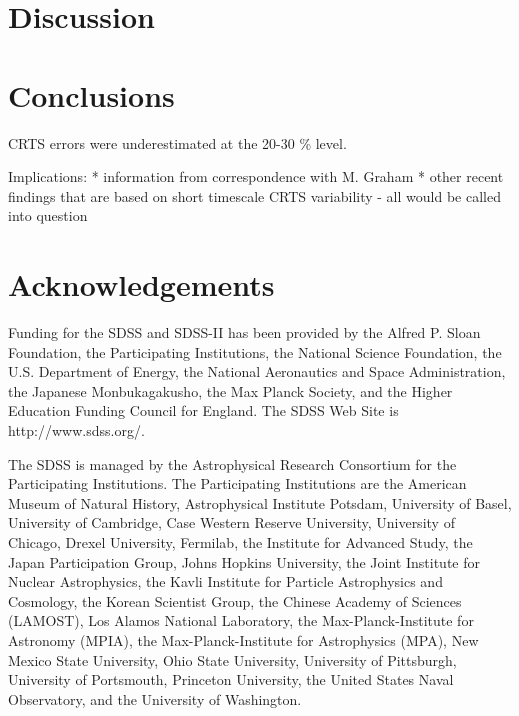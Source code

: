 \documentclass[fleqn,usenatbib]{mnras}  %
\begin{document}
\section{Discussion}
\label{sec:discussion}

\section{Conclusions}
\label{sec:conclusions}
CRTS errors were underestimated at the 20-30 \% level.

Implications:  * information from correspondence with M. Graham  
* other recent findings that are based on short timescale CRTS variability  - all would be called into question  



\section*{Acknowledgements}

Funding for the SDSS and SDSS-II has been provided by the Alfred P. Sloan Foundation, the Participating Institutions, the National Science Foundation, the U.S. Department of Energy, the National Aeronautics and Space Administration, the Japanese Monbukagakusho, the Max Planck Society, and the Higher Education Funding Council for England. The SDSS Web Site is http://www.sdss.org/.

The SDSS is managed by the Astrophysical Research Consortium for the Participating Institutions. The Participating Institutions are the American Museum of Natural History, Astrophysical Institute Potsdam, University of Basel, University of Cambridge, Case Western Reserve University, University of Chicago, Drexel University, Fermilab, the Institute for Advanced Study, the Japan Participation Group, Johns Hopkins University, the Joint Institute for Nuclear Astrophysics, the Kavli Institute for Particle Astrophysics and Cosmology, the Korean Scientist Group, the Chinese Academy of Sciences (LAMOST), Los Alamos National Laboratory, the Max-Planck-Institute for Astronomy (MPIA), the Max-Planck-Institute for Astrophysics (MPA), New Mexico State University, Ohio State University, University of Pittsburgh, University of Portsmouth, Princeton University, the United States Naval Observatory, and the University of Washington. 





%



\bsp	%
\label{lastpage}
\end{document}
